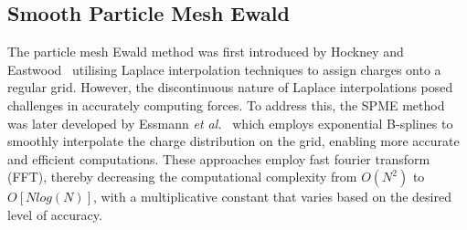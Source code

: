 \subsection{Smooth Particle Mesh Ewald}
The particle mesh Ewald method was first introduced by Hockney and Eastwood~\cite{hockney2021computer} utilising Laplace interpolation techniques to assign charges onto a regular grid. However, the discontinuous nature of Laplace interpolations posed challenges in accurately computing forces. To address this, the \ac{SPME} method was later developed by Essmann \textit{et al.}~\cite{SPME} which employs exponential B-splines to smoothly interpolate the charge distribution on the grid, enabling more accurate and efficient computations. These approaches employ fast fourier transform (FFT), thereby decreasing the computational complexity from $O(N^2)$ to $O[Nlog(N)]$, with a multiplicative constant that varies based on the desired level of accuracy.

